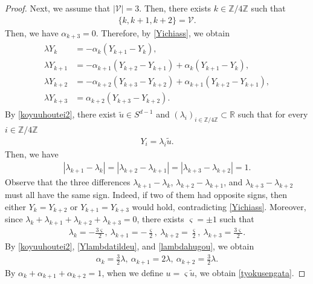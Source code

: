 \documentclass[10pt,a4paper]{amsart}
\numberwithin{equation}{section}
\begin{document}
\begin{proof}
Next, we assume that $|\mathcal{V}|=3$. Then, there exists $k\in\mathbb{Z}/4\mathbb{Z}$ such that 
\begin{align*}
\{k,k+1,k+2\}=\mathcal{V}.
\end{align*}
Then, we have $\alpha_{k+3}=0$. Therefore, by \eqref{Yichiass}, we obtain
\begin{align}\label{koyuuhoutei2}
\begin{aligned}
\lambda Y_k&=-\alpha_k\left(Y_{k+1}-Y_k\right),
\\
\lambda Y_{k+1}&=-\alpha_{k+1}\left(Y_{k+2}-Y_{k+1}\right)+\alpha_k\left(Y_{k+1}-Y_k\right),
\\
\lambda Y_{k+2}&=-\alpha_{k+2}\left(Y_{k+3}-Y_{k+2}\right)+\alpha_{k+1}\left(Y_{k+2}-Y_{k+1}\right),
\\
\lambda Y_{k+3}&=\alpha_{k+2}\left(Y_{k+3}-Y_{k+2}\right).
\end{aligned}
\end{align}
By \eqref{koyuuhoutei2}, there exist $\tilde{u}\in S^{d-1}$ and $(\lambda_i)_{i\in\mathbb{Z}/4\mathbb{Z}}\subset \mathbb{R}$ such that for every $i\in\mathbb{Z}/4\mathbb{Z}$
\begin{align}\label{Ylambdatildeu}
Y_i=\lambda_i \tilde{u}. 
\end{align}
Then, we have
\begin{align*}
\left|\lambda_{k+1}-\lambda_k\right|=\left|\lambda_{k+2}-\lambda_{k+1}\right|=\left|\lambda_{k+3}-\lambda_{k+2}\right|=1.
\end{align*}
Observe that the three differences $\lambda_{k+1}-\lambda_k$, $\lambda_{k+2}-\lambda_{k+1}$, and $\lambda_{k+3}-\lambda_{k+2}$ must all have the same sign. Indeed, if two of them had opposite signs, then either
$Y_k=Y_{k+2}$ or $Y_{k+1}=Y_{k+3}$ would hold, contradicting \eqref{Yichiass}. Moreover, since $\lambda_k+\lambda_{k+1}+\lambda_{k+2}+\lambda_{k+3}=0$, there exists $\varsigma=\pm 1$ such that
\begin{align}\label{lambdahugou}
\lambda_k=-\frac{3\varsigma}{2},\ \lambda_{k+1}=-\frac{\varsigma}{2},\ \lambda_{k+2}=\frac{\varsigma}{2},\ \lambda_{k+3}=\frac{3\varsigma}{2}. 
\end{align}
By \eqref{koyuuhoutei2}, \eqref{Ylambdatildeu}, and \eqref{lambdahugou}, we obtain
\begin{align*}
\alpha_k=\frac{3}{2}\lambda,\ \alpha_{k+1}=2\lambda,\ \alpha_{k+2}=\frac{3}{2}\lambda.
\end{align*}
By $\alpha_k+\alpha_{k+1}+\alpha_{k+2}=1$, when we define $u=\varsigma \tilde{u}$, we obtain \eqref{tyokusengata}.


\end{proof}
\end{document}

